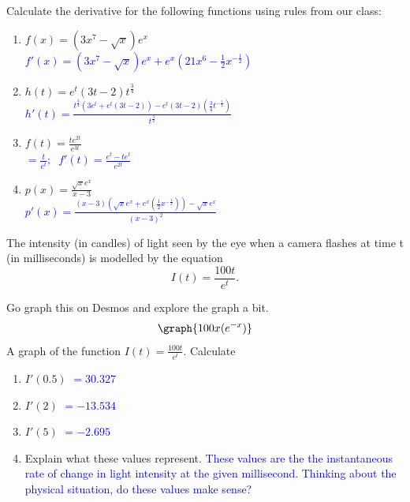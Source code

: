 \documentclass{ximera}
\begin{document}
\begin{exercise}
    Calculate the derivative for the following functions using rules from our class: 
        \begin{enumerate}
            \item $f(x)=(3x^7-\sqrt{x})e^x$\\
            \textcolor{blue}{ $f'(x)=(3x^7-\sqrt{x})e^x+e^x(21x^6-\frac{1}{2}x^{-\frac{1}{2}})$}
       
            \item $h(t)=e^t(3t-2)t^{\frac{3}{4}}$\\
            \textcolor{blue}{ $h'(t)=\frac{t^{\frac{3}{4}}(3e^t+e^t(3t-2))-e^t(3t-2)(\frac{3}{4}t^{-\frac{1}{4}})}{t^{\frac{3}{2}}}$}
       
            \item $f(t)=\frac{te^{2t}}{e^{3t}}$\\
            \textcolor{blue}{ $=\frac{t}{e^t};\;\; f'(t)=\frac{e^t-te^t}{e^{2t}}$}
        
            \item $p(x)=\frac{\sqrt{x}e^x}{x-3}$\\
            \textcolor{blue}{ $p'(x)=\frac{(x-3)(\sqrt{x}e^x+e^x(\frac{1}{2}x^{-\frac{1}{2}}))-\sqrt{x}e^x}{(x-3)^2}$}
        \end{enumerate}
\end{exercise}

\begin{exercise}
    The intensity (in candles) of light seen by the eye when a camera flashes at time t (in milliseconds) is modelled by the equation
        $$I(t)=\frac{100t}{e^t}.$$
      
    Go graph this on Desmos and explore the graph a bit.
        \[
        \graph{100x(e^{-x})}
        \]
    \xmalt A graph of the function $I(t)=\frac{100t}{e^t}$.
    Calculate 
    \begin{enumerate}
        \item[a.] $I'(0.5)$ 
        \textcolor{blue}{$=30.327$}
        \item[b.] $I'(2)$
        \textcolor{blue}{ $=-13. 534$}
        \item[c.] $I'(5)$
        \textcolor{blue}{ $=-2.695$}
        \item[d.] Explain what these values represent. 
        \textcolor{blue}{ These values are the the instantaneous rate of change in light intensity at the given millisecond.  Thinking about the physical situation, do these values make sense?}
\end{enumerate}

\end{exercise}
\end{document}
